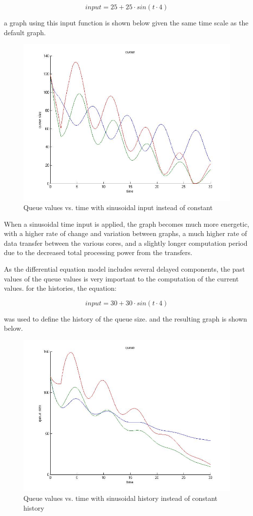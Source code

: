 \documentclass{article}
\begin{document}
\begin{equation} 
input=25+25\cdot sin(t\cdot4)
\end{equation}

a graph using this input function is shown below given the same time scale as the default graph.

\begin{figure}[h]
\label{Sin input}
\centering
\includegraphics[width=.4\linewidth] {sinusodial_input}
\caption{Queue values vs. time with sinusoidal input instead of constant}
\end{figure}

When a sinusoidal time input is applied, the graph becomes much more energetic, with a higher rate of change and variation between graphs, a much higher rate of data transfer between the various cores, and a slightly longer computation period due to the decreased total processing power from the transfers. 

As the differential equation model includes several delayed components, the past values of the queue values is very important to the computation of the current values. for the histories, the equation:

\begin{equation} 
input=30+30\cdot sin(t\cdot4)
\end{equation}

was used to define the history of the queue size. and the resulting graph is shown below.

\begin{figure}[h]
\label{sin history}
\centering
\includegraphics[width=.4\linewidth] {sinusoidal_history}
\caption{Queue values vs. time with sinusoidal history instead of constant history}
\end{figure}
\end{document}
